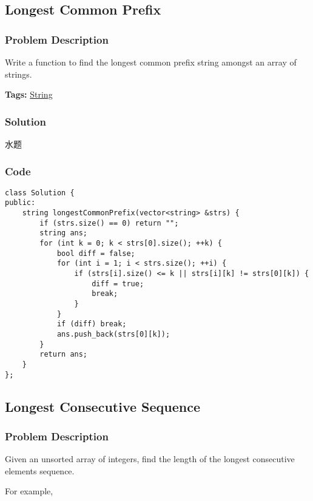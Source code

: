 \documentclass{article}
\begin{document}
\begin{CJK*}{UTF8}{gkai}
\subsection{ Longest Common Prefix }
\label{ Longest Common Prefix }

\subsubsection*{Problem Description}
Write a function to find the longest common prefix string amongst an array of strings.


\textbf{Tags: }
\hyperref[ String ]{ String }



\subsubsection*{Solution}
水题

\subsubsection*{Code}
\begin{lstlisting}
class Solution {
public:
    string longestCommonPrefix(vector<string> &strs) {
        if (strs.size() == 0) return "";
        string ans;
        for (int k = 0; k < strs[0].size(); ++k) {
            bool diff = false;
            for (int i = 1; i < strs.size(); ++i) {
                if (strs[i].size() <= k || strs[i][k] != strs[0][k]) {
                    diff = true;
                    break;
                }
            }
            if (diff) break;
            ans.push_back(strs[0][k]);
        }
        return ans;
    }
}; 
\end{lstlisting}


\subsection{ Longest Consecutive Sequence }
\label{ Longest Consecutive Sequence }

\subsubsection*{Problem Description}
Given an unsorted array of integers, find the length of the longest consecutive elements sequence.

For example,



\end{CJK*}
\end{document}
